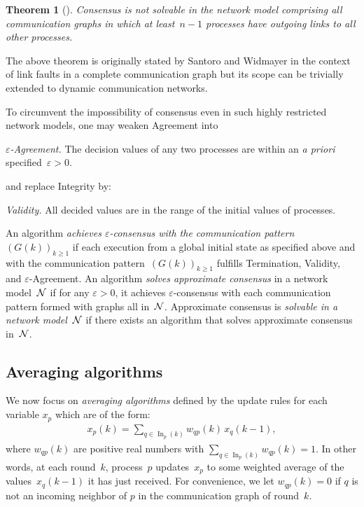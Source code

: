 \documentclass[a4paper]{article}
\theoremstyle{newthm}
\newtheorem{thm}{Theorem}
\renewcommand{\ge}{\geqslant}
\DeclareMathOperator\In{In}
\begin{document}
\begin{thm}[\cite{SW89}]\label{thm:SW}
Consensus is not solvable in the network model comprising all
     communication graphs in which at least~$n-1$ processes have
     outgoing links to all other processes.
\end{thm}

The above theorem is  originally stated by Santoro and Widmayer  in the context of link faults
	in a complete communication graph but its scope can be trivially extended to dynamic 
	communication networks.
 

To circumvent the impossibility of consensus even in such
     highly restricted network models, one may  weaken Agreement into 
 \begin{description}
\item{\em $\varepsilon$-Agreement.} The decision values of any two processes
  are within an {\it a priori} specified~$\varepsilon > 0$.
\end{description}
and replace  Integrity by:       
\begin{description}
\item{\em Validity.}  All decided values are in the range of the initial values of
     processes.
\end{description}

An algorithm {\em  achieves $\varepsilon$-consensus with the communication pattern}~$(G(k))_{k\ge 1}$ 
	 if each execution from a global initial state as specified above and
             with the communication pattern~$(G(k))_{k\ge 1}$   fulfills Termination, 
             Validity, and $\varepsilon$-Agreement. 
 An algorithm {\em  solves approximate consensus\/} in a network
	     model~${\cal N}$ if for any $\varepsilon >0$, it achieves $\varepsilon$-consensus with each communication
	     pattern formed with graphs all in~${\cal N}$.
Approximate consensus is {\em solvable in a network model~${\cal N}$\/} if 
	there exists an algorithm that solves   approximate consensus in~${\cal N}$.

\subsection{Averaging algorithms}

We now focus on  {\em averaging algorithms} defined by the update rules 
	for each variable $x_p$ which are of the form:
	\begin{align}
 	x_p(k) = \sum_{q \in \In_p(k)} w_{qp}(k) \, x_q(k-1) ,\label{eq:update}
	\end{align}
where $w_{qp}(k)$ are  positive real numbers with  $\sum_{q \in \In_p(k)} w_{qp}(k) = 1$.
 In other words,  at each round~$k$, process~$p$ updates~$x_p$ to some weighted average
	of the values~$x_q(k-1)$ it has just received.
For convenience, we let $w_{qp}(k) = 0$ if $q$ is not an incoming neighbor of $p$ in the
	communication graph of round~$k$.
\end{document}
